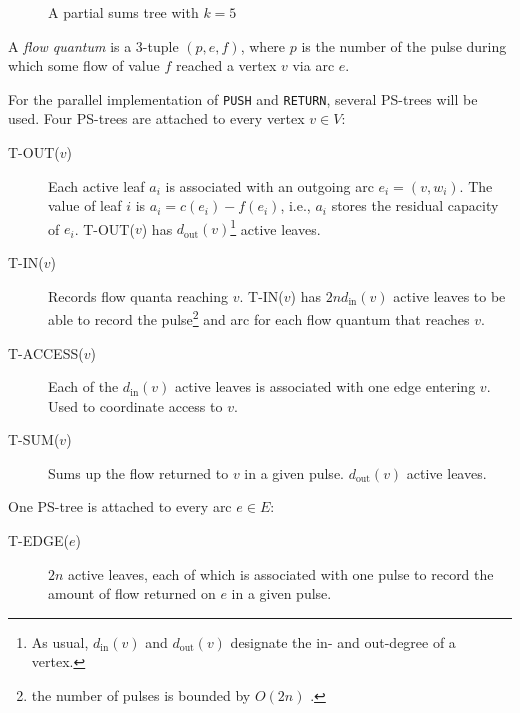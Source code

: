 \documentclass[a4paper,10pt, twocolumn]{article}
\begin{document}
\begin{figure}[H]
\begin{center}
\end{center}
\caption{A partial sums tree with $k=5$}
\label{fig:pstree}
\end{figure}

A \emph{flow quantum} is a 3-tuple $(p, e, f)$, where $p$ is the number of the pulse during which some flow of value $f$ reached a vertex $v$ via arc $e$.

For the parallel implementation of \lstinline|PUSH| and \lstinline|RETURN|, several PS-trees will be used. Four PS-trees are attached to every vertex $v \in V$:
\begin{description}
	\item [T-OUT($v$)] Each active leaf $a_i$ is associated with an outgoing arc $e_i = (v, w_i)$. The value of leaf $i$ is $a_i = c(e_i) - f(e_i)$, i.e., $a_i$ stores the residual capacity of $e_i$. T-OUT($v$) has $d_{\mathrm{out}}(v)$\footnote{As usual, $d_{\mathrm{in}}(v)$ and $d_{\mathrm{out}}(v)$ designate the in- and out-degree of a vertex.} active leaves.
	\item [T-IN($v$)] Records flow quanta reaching $v$. T-IN($v$) has $2nd_{\mathrm{in}}(v)$ active leaves to be able to record the pulse\footnote{the number of pulses is bounded by $O(2n)$ \cite{yossi81}.} and arc for each flow quantum that reaches $v$. 
	\item [T-ACCESS($v$)] Each of the $d_{\mathrm{in}}(v)$ active leaves is associated with one edge entering $v$. Used to coordinate access to $v$.
	\item [T-SUM($v$)] Sums up the flow returned to $v$ in a given pulse. $d_{\mathrm{out}}(v)$ active leaves. 
\end{description}
One PS-tree is attached to every arc $e \in E$:
\begin{description}
	\item [T-EDGE($e$)] $2n$ active leaves, each of which is associated with one pulse to record the amount of flow returned on $e$ in a given pulse.
\end{description}
\end{document}
